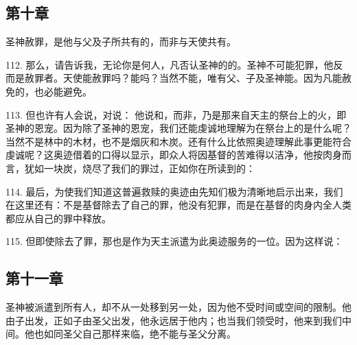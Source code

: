 
\subsection{第十章}

圣神赦罪，是他与父及子所共有的，而非与天使共有。\par

112. 那么，请告诉我，无论你是何人，凡否认圣神的的。圣神不可能犯罪，他反而是赦罪者。天使能赦罪吗？能吗？当然不能，唯有父、子及圣神能。因为凡能赦免的，也必能避免。\par

113. 但也许有人会说，对说： 他说和，而非，乃是那来自天主的祭台上的火，即圣神的恩宠。因为除了圣神的恩宠，我们还能虔诚地理解为在祭台上的是什么呢？当然不是林中的木材，也不是烟灰和木炭。还有什么比依照奥迹理解此事更能符合虔诚呢？这奥迹借着的口得以显示，即众人将因基督的苦难得以洁净，他按肉身而言，犹如一块炭，烧尽了我们的罪过，正如你在所读到的：\par

114. 最后，为使我们知道这普遍救赎的奥迹由先知们极为清晰地启示出来，我们在这里还有：不是基督除去了自己的罪，他没有犯罪，而是在基督的肉身内全人类都应从自己的罪中释放。\par

115. 但即使除去了罪，那也是作为天主派遣为此奥迹服务的一位。因为这样说：\par


\subsection{第十一章}

圣神被派遣到所有人，却不从一处移到另一处，因为他不受时间或空间的限制。他由子出发，正如子由圣父出发，他永远居于他内；也当我们领受时，他来到我们中间。他也如同圣父自己那样来临，绝不能与圣父分离。\par

